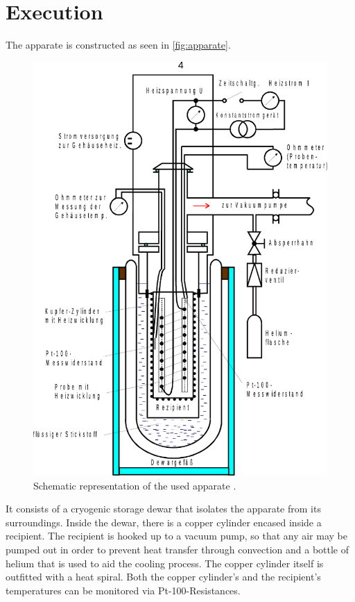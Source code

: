 \section{Execution}
\label{sec:Durchführung}

The apparate is constructed as seen in \autoref{fig:apparate}.

\begin{figure}[H]
    \centering
    \includegraphics[]{figures/apparature.pdf}
    \caption{Schematic representation of the used apparate \cite{v47}.}
    \label{fig:apparate}
\end{figure}

It consists of a cryogenic storage dewar that isolates the apparate from its surroundings. Inside the dewar, there is a copper cylinder encased inside a recipient.
The recipient is hooked up to a vacuum pump, so that any air may be pumped out in order to prevent heat transfer through convection and a bottle of helium that is used to aid the cooling process.
The copper cylinder itself is outfitted with a heat spiral.
Both the copper cylinder's and the recipient's temperatures can be monitored via Pt-100-Resistances. \\

